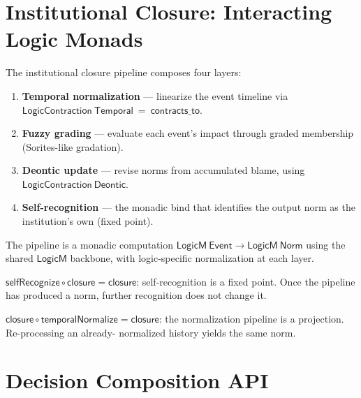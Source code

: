 \section{Institutional Closure: Interacting Logic Monads}

\begin{definition}
\label{def:institutional_closure}
\leanok
{}
The institutional closure pipeline composes four layers:
\begin{enumerate}
  \item \textbf{Temporal normalization} --- linearize the event timeline via
    $\mathsf{LogicContraction\ Temporal\ =\ contracts\_to}$.
  \item \textbf{Fuzzy grading} --- evaluate each event's impact through
    graded membership (Sorites-like gradation).
  \item \textbf{Deontic update} --- revise norms from accumulated
    blame, using $\mathsf{LogicContraction\ Deontic}$.
  \item \textbf{Self-recognition} --- the monadic bind that identifies
    the output norm as the institution's own (fixed point).
\end{enumerate}
The pipeline is a monadic computation $\mathsf{LogicM\ Event \to LogicM\ Norm}$
using the shared $\mathsf{LogicM}$ backbone, with logic-specific normalization
at each layer.
\end{definition}

\begin{theorem}
\label{thm:closure_fixed_point}
\leanok
{}
$\mathsf{selfRecognize} \circ \mathsf{closure} = \mathsf{closure}$:
self-recognition is a fixed point. Once the pipeline has produced a norm,
further recognition does not change it.
\end{theorem}

\begin{theorem}
\label{thm:normalization_idempotent}
\leanok
{}
$\mathsf{closure} \circ \mathsf{temporalNormalize} = \mathsf{closure}$:
the normalization pipeline is a projection. Re-processing an already-
normalized history yields the same norm.
\end{theorem}

\section{Decision Composition API}

